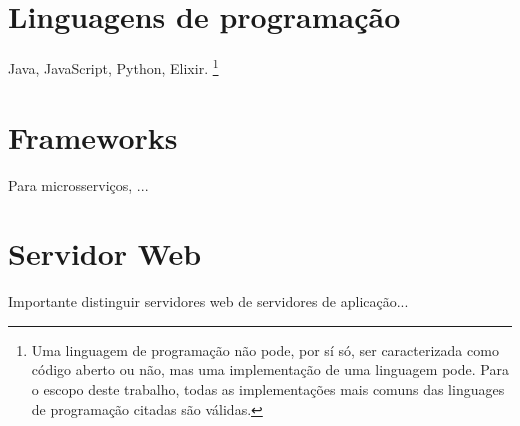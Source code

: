 

\section{Linguagens de programação}
Java, JavaScript, Python, Elixir. \footnote{Uma linguagem de programação não pode, por sí só, ser caracterizada como código aberto ou não, mas uma implementação de uma linguagem pode. Para o escopo deste trabalho, todas as implementações mais comuns das linguages de programação citadas são válidas.}


\section{Frameworks}
  Para microsserviços, ...

\section{Servidor Web}
Importante distinguir servidores web de servidores de aplicação...

